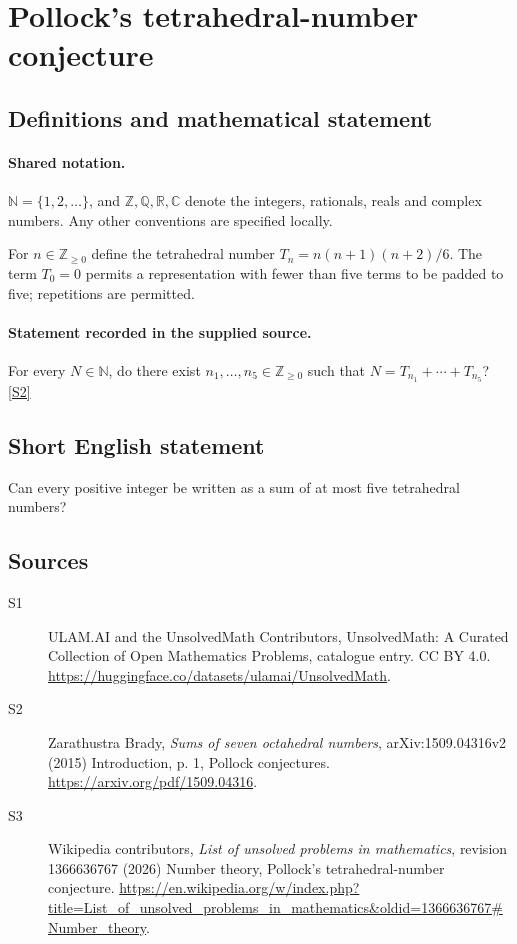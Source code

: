 \documentclass[11pt]{article}
\newcommand{\sref}[2]{\hyperlink{source:#1:#2}{[S#2]}}
\begin{document}
\section{Pollock's tetrahedral-number conjecture}\label{statement}

\subsection{Definitions and mathematical statement}

\paragraph{Shared notation.}$\mathbb N=\{1,2,\ldots\}$, and $\mathbb Z,\mathbb Q,\mathbb R,\mathbb C$ denote the integers, rationals, reals and complex numbers. Any other conventions are specified locally.


For $n\in\mathbb Z_{\ge0}$ define the tetrahedral number $T_n=n(n+1)(n+2)/6$. The term $T_0=0$ permits a representation with fewer than five terms to be padded to five; repetitions are permitted.
\paragraph{Statement recorded in the supplied source.}
For every $N\in\mathbb N$, do there exist $n_1,\ldots,n_5\in\mathbb Z_{\ge0}$ such that $N=T_{n_1}+\cdots+T_{n_5}$? \sref{statement}{2}
\subsection{Short English statement}
Can every positive integer be written as a sum of at most five tetrahedral numbers?
\subsection{Sources}
\begin{description}
\item[\hypertarget{source:statement:1}{S1}] ULAM.AI and the UnsolvedMath Contributors, UnsolvedMath: A Curated Collection of Open Mathematics Problems, catalogue entry. CC BY 4.0. \url{https://huggingface.co/datasets/ulamai/UnsolvedMath}.
\item[\hypertarget{source:statement:2}{S2}] Zarathustra Brady, \emph{Sums of seven octahedral numbers}, arXiv:1509.04316v2 (2015) Introduction, p. 1, Pollock conjectures. \url{https://arxiv.org/pdf/1509.04316}.
\item[\hypertarget{source:statement:3}{S3}] Wikipedia contributors, \emph{List of unsolved problems in mathematics}, revision 1366636767 (2026) Number theory, Pollock's tetrahedral-number conjecture. \url{https://en.wikipedia.org/w/index.php?title=List_of_unsolved_problems_in_mathematics&oldid=1366636767#Number_theory}.
\end{description}
\label{end:statement}
\end{document}
